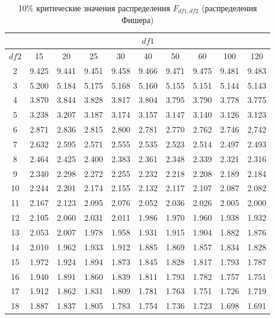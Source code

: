 \documentclass[12pt]{article}
\begin{document}
\begin{table}
\caption{10\% критические значения распределения $F_{df1,df2}$
(распределения Фишера) }
\begin{center}
{\footnotesize
\begin{tabular}{|c|c|c|c|c|c|c|c|c|c|}
	\hline
	& \multicolumn{9}{|c|}{$df1$} \\ \hline
	$df2$ & 15&  20&  25 & 30 & 40 & 50 & 60 & 100 &120\\ \hline \hline
	2 & 9.425&   9.441& 9.451& 9.458& 9.466&   9.471&   9.475& 9.481& 9.483\\
	3 &  5.200& 5.184& 5.175& 5.168& 5.160&   5.155&   5.151&   5.144& 5.143\\
	4 &  3.870& 3.844& 3.828& 3.817& 3.804&   3.795&   3.790&   3.778&   3.775\\
	5 & 3.238& 3.207& 3.187& 3.174& 3.157&   3.147&   3.140&   3.126&3.123\\
	6 & 2.871& 2.836 &2.815& 2.800& 2.781&   2.770&   2.762&   2.746&2,742\\
	7 & 2.632 &2.595 &2.571 &2.555 &2.535 &2.523   &2.514   &2.497 &2.493\\
	8 & 2.464 &2.425 &2.400 &2.383 &2.361 &2.348 &2.339 &2.321 &2.316\\
	9 & 2.340 &2.298 &2.272 &2.255 &2.232 &2.218 &2.208 &2.189 &2.184\\
	10 & 2.244 &2.201 &2.174 &2.155 &2.132 &2.117 &2.107 &2.087 &2.082\\
	11 & 2.167 &2.123 &2.095 &2.076 &2.052 &2.036 &2.026 &2.005 &2.000\\
	12 & 2.105 &2.060 &2.031 &2.011 &1.986 &1.970 &1.960 &1.938 &1.932\\
	13 & 2.053 &2.007 &1.978 &1.958 &1.931 &1.915 &1.904 &1.882 &1.876\\
	14 & 2.010 &1.962 &1.933 &1.912 &1.885 &1.869 &1.857 &1.834 &1.828\\
	15 & 1.972 &1.924 &1.894 &1.873 &1.845 &1.828 &1.817 &1.793 &1.787\\
	16 & 1.940 &1.891 &1.860 &1.839 &1.811 &1.793 &1.782 &1.757 &1.751\\
	17 & 1.912 &1.862 &1.831 &1.809 &1.781 &1.763 &1.751 &1.726 &1.719\\
	18 & 1.887 &1.837 &1.805 &1.783 &1.754 &1.736 &1.723 &1.698 &1.691\\

\end{tabular}}
\end{center}
\end{table}
\end{document}
